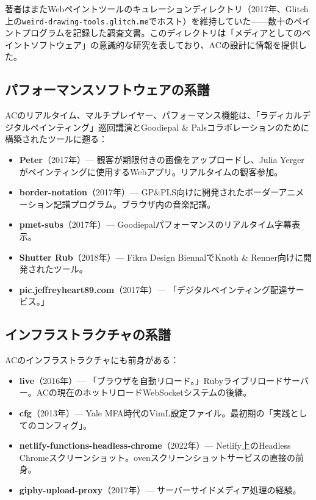 \documentclass[10pt,letterpaper,twocolumn]{article}
\begin{document}
著者はまたWebペイントツールのキュレーションディレクトリ（2017年、Glitch上の\texttt{weird-drawing-tools.glitch.me}でホスト）を維持していた——数十のペイントプログラムを記録した調査文書。このディレクトリは「メディアとしてのペイントソフトウェア」の意識的な研究を表しており、ACの設計に情報を提供した。

\subsection{パフォーマンスソフトウェアの系譜}

ACのリアルタイム、マルチプレイヤー、パフォーマンス機能は、「ラディカルデジタルペインティング」巡回講演とGoodiepal \& Palsコラボレーションのために構築されたツールに遡る：

\begin{itemize}
  \item \textbf{Peter}（2017年）--- 観客が期限付きの画像をアップロードし、Julia Yergerがペインティングに使用するWebアプリ。リアルタイムの観客参加。
  \item \textbf{border-notation}（2017年）--- GP\&PLS向けに開発されたボーダーアニメーション記譜プログラム。ブラウザ内の音楽記譜。
  \item \textbf{pmet-subs}（2017年）--- Goodiepalパフォーマンスのリアルタイム字幕表示。
  \item \textbf{Shutter Rub}（2018年）--- Fikra Design BiennalでKnoth \& Renner向けに開発されたツール。
  \item \textbf{pic.jeffreyheart89.com}（2017年）--- 「デジタルペインティング配達サービス。」
\end{itemize}

\subsection{インフラストラクチャの系譜}

ACのインフラストラクチャにも前身がある：

\begin{itemize}
  \item \textbf{live}（2016年）--- 「ブラウザを自動リロード。」Rubyライブリロードサーバー。ACの現在のホットリロードWebSocketシステムの後継。
  \item \textbf{cfg}（2013年）--- Yale MFA時代のVimL設定ファイル。最初期の「実践としてのコンフィグ」。
  \item \textbf{netlify-functions-headless-chrome}（2022年）--- Netlify上のHeadless Chromeスクリーンショット。ovenスクリーンショットサービスの直接の前身。
  \item \textbf{giphy-upload-proxy}（2017年）--- サーバーサイドメディア処理の経験。
\end{itemize}
\end{document}
